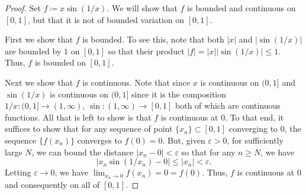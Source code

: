 \begin{proof}

  Set $f\coloneq x\sin (1/x)$. We will show that $f$ is bounded and
  continuous on $[0,1]$, but that it is not of bounded variation on
  $[0,1]$.

  First we show that $f$ is bounded. To see this, note that both $|x|$ and
  $|\sin (1/x)|$ are bounded by $1$ on $[0,1]$ so that their product
  $|f|=|x||\sin (1/x)|\leq 1$. Thus, $f$ is bounded on $[0,1]$.

  Next we show that $f$ is continuous. Note that since $x$ is continuous
  on $(0,1]$ and $\sin(1/x)$ is continuous on $(0,1]$ since it is the
  composition $1/x\colon (0,1]\to (1,\infty)$, $\sin\colon(1,\infty)\to
  [0,1]$ both of which are continuous functions. All that is left to show
  is that $f$ is continuous at $0$. To that end, it suffices to show that
  for any sequence of point ${\{x_n\}}\subset[0,1]$ converging to $0$, the
  sequence ${\{f(x_n)\}}$ converges to $f(0)=0$. But, given
  $\varepsilon>0$, for sufficiently large $N$, we can bound the distance
  $|x_n-0|<\varepsilon$ so that for any $n\geq N$, we have
  \begin{equation}
    \label{eq:1:1}
    |x_n\sin(1/x_n)-0|\leq |x_n|<\varepsilon.
  \end{equation}
  Letting $\varepsilon\to 0$, we have $\lim_{x_n\to 0}f(x_n)=0=f(0)$. Thus,
  $f$ is continuous at $0$ and consequently on all of $[0,1]$.


\end{proof}
